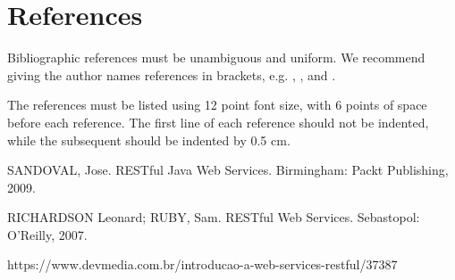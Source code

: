 \documentclass[12pt]{article}
\begin{document}
\section{References}

Bibliographic references must be unambiguous and uniform.  We recommend giving
the author names references in brackets, e.g. \cite{knuth:84},
\cite{boulic:91}, and \cite{smith:99}.

The references must be listed using 12 point font size, with 6 points of space
before each reference. The first line of each reference should not be
indented, while the subsequent should be indented by 0.5 cm.

SANDOVAL, Jose. RESTful Java Web Services. Birmingham: Packt Publishing,
2009.

RICHARDSON Leonard; RUBY, Sam. RESTful Web Services. Sebastopol: O'Reilly,
2007.

https://www.devmedia.com.br/introducao-a-web-services-restful/37387



\end{document}
